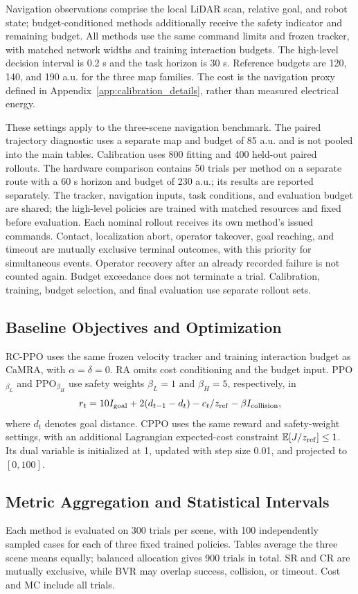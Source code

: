 \documentclass[conference]{IEEEtran}
\begin{document}
Navigation observations comprise the local LiDAR scan, relative goal, and robot
state; budget-conditioned methods additionally receive the safety indicator and
remaining budget. All methods use the same command limits and frozen tracker,
with matched network widths and training interaction budgets. The high-level
decision interval is 0.2 s and the task horizon is 30 s. Reference budgets are
120, 140, and 190 a.u. for the three map families. The cost is the navigation
proxy defined in Appendix~\ref{app:calibration_details}, rather than measured
electrical energy.

These settings apply to the three-scene navigation benchmark. The paired
trajectory diagnostic uses a separate map and budget of 85 a.u. and is not
pooled into the main tables. Calibration uses 800 fitting and 400 held-out
paired rollouts. The hardware comparison contains 50 trials per method on a
separate route with a 60 s horizon and budget of 230 a.u.; its results are
reported separately. The tracker, navigation inputs, task conditions, and
evaluation budget are shared; the high-level policies are trained with matched
resources and fixed before evaluation. Each nominal rollout receives its own
method's issued commands. Contact, localization abort, operator takeover, goal
reaching, and timeout are mutually exclusive terminal outcomes, with this
priority for simultaneous events. Operator recovery after an already recorded
failure is not counted again. Budget exceedance does not terminate a trial.
Calibration, training, budget selection, and final evaluation use separate
rollout sets.

\subsection{Baseline Objectives and Optimization}
RC-PPO uses the same frozen velocity tracker and training interaction budget as
CaMRA, with $\alpha=\delta=0$. RA omits cost conditioning and the budget input.
PPO$_{\beta_L}$ and PPO$_{\beta_H}$ use safety weights $\beta_L=1$ and
$\beta_H=5$, respectively, in
\[
r_t=10I_{\rm goal}+2(d_{t-1}-d_t)-c_t/z_{\rm ref}
-\beta I_{\rm collision},
\]
where $d_t$ denotes goal distance. CPPO uses the same reward and safety-weight
settings, with an additional Lagrangian expected-cost constraint
$\mathbb E[J/z_{\rm ref}]\leq1$. Its dual variable is initialized at 1,
updated with step size 0.01, and projected to $[0,100]$.

\subsection{Metric Aggregation and Statistical Intervals}
Each method is evaluated on 300 trials per scene, with 100 independently
sampled cases for each of three fixed trained policies. Tables average the
three scene means equally; balanced allocation gives 900 trials in total.
SR and CR are mutually exclusive, while BVR may overlap success, collision,
or timeout. Cost and MC include all trials.
\end{document}
